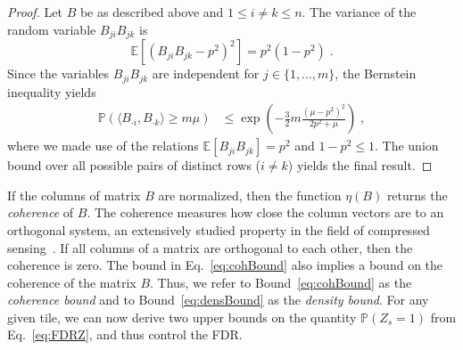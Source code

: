 \begin{proof}
Let $B$ be as described above and $1\leq i\neq k\leq n$. The variance of the random variable $B_{ji}B_{jk}$ is
\[\mathbb{E}\left[\left(B_{ji}B_{jk}-p^2\right)^2\right]=p^2(1-p^2)\;.\]
Since the variables $B_{ji}B_{jk}$ are independent for $j\in\{1,\ldots,m\}$, the Bernstein inequality yields 
\begin{align*}
\mathbb{P}(\langle B_{\cdot i},B_{\cdot k}\rangle\geq m\mu) & \leq \exp\left( -\frac{3}{2}m\frac{(\mu-p^2)^2}{2p^2+\mu}\right)\;,
\end{align*}
where we made use of the relations $\mathbb{E}[B_{ji}B_{jk}]=p^2$ and $1-p^2\leq 1$.
The union bound over all possible pairs of distinct rows ($i\neq k$) yields the final result.
\end{proof}

If the columns of matrix $B$ are normalized, then the function $\eta(B)$ returns the \emph{coherence} of $B$. The coherence measures how close the column vectors are to an orthogonal system, an extensively studied property in the field of compressed sensing~\cite{foucart2013mathematical}. If all columns of a matrix are orthogonal to each other, then the coherence is zero. The bound in Eq.~\eqref{eq:cohBound} also implies a bound on the coherence of the matrix $B$. Thus, we refer to Bound~\eqref{eq:cohBound} as the \emph{coherence bound} and to Bound~\eqref{eq:densBound} as the \emph{density bound}. For any given tile, we can now derive two upper bounds on the quantity $\mathbb{P}(Z_s=1)$ from Eq.~\eqref{eq:FDRZ}, and thus control the FDR.
